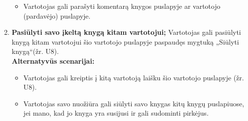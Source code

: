 \documentclass{VUMIFPSkursinis}
\begin{document}
\begin{enumerate}[label=\textbf{U\arabic*.}]
				\begin{itemize}
					\item Vartotojas gali parašyti komentarą knygos puslapyje ar vartotojo (pardavėjo) puslapyje.
				\end{itemize}
			\item \textbf{Pasiūlyti savo įkeltą knygą kitam vartotojui;}
				Vartotojas gali pasiūlyti knygą kitam vartotojui šio vartotojo puslapyje paspaudęs mygtuką „Siūlyti knygą“(žr. U8).\\
				\textbf{Alternatyvūs scenarijai:}
				\begin{itemize}
					\item Vartotojas gali kreiptis į kitą vartotoją laišku šio vartotojo puslapyje (žr. U8).
					\item Vartotojas savo nuožiūra gali siūlyti savo knygas kitų knygų puslapiuose, jei mano, kad jo knyga yra susijusi ir gali sudominti pirkėjus.
				\end{itemize}
		\end{enumerate}
\end{document}
